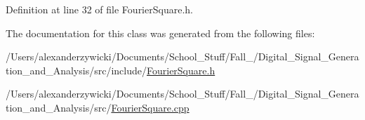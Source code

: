 Definition at line 32 of file Fourier\+Square.\+h.



The documentation for this class was generated from the following files\+:\begin{DoxyCompactItemize}
\item 
/\+Users/alexanderzywicki/\+Documents/\+School\+\_\+\+Stuff/\+Fall\+\_/\+Digital\+\_\+\+Signal\+\_\+\+Generation\+\_\+and\+\_\+\+Analysis/src/include/\hyperlink{FourierSquare_8h}{Fourier\+Square.\+h}\item 
/\+Users/alexanderzywicki/\+Documents/\+School\+\_\+\+Stuff/\+Fall\+\_/\+Digital\+\_\+\+Signal\+\_\+\+Generation\+\_\+and\+\_\+\+Analysis/src/\hyperlink{FourierSquare_8cpp}{Fourier\+Square.\+cpp}\end{DoxyCompactItemize}
